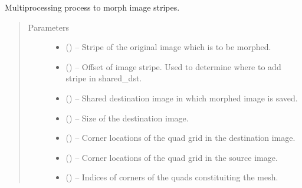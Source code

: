 \documentclass[letterpaper,10pt,english]{sphinxmanual}
\begin{document}

\begin{fulllineitems}
\label{\detokenize{image_morphing:image_morphing.morph_process}}
Multiprocessing process to morph image stripes.
\begin{quote}\begin{description}
\item[{Parameters}] \leavevmode\begin{itemize}
\item {} 
 () -- Stripe of the original image which is to be morphed.

\item {} 
 () -- Offset of image stripe. Used to determine where to add stripe
in shared\_dst.

\item {} 
 () -- Shared destination image in which morphed image is saved.

\item {} 
 () -- Size of the destination image.

\item {} 
 () -- Corner locations of the quad grid in the destination image.

\item {} 
 () -- Corner locations of the quad grid in the source image.

\item {} 
 () -- Indices of corners of the quads constituiting the mesh.

\end{itemize}

\end{description}\end{quote}

\end{fulllineitems}
\end{document}

